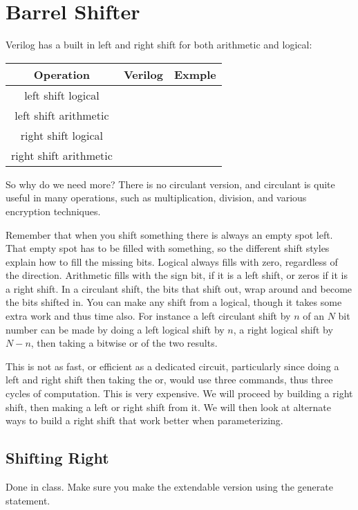 \chapter{Barrel Shifter}

Verilog has a built in left and right shift for both arithmetic and logical:

\begin{tabular}{ccr}
Operation & Verilog &  Exmple\\ \hline
left shift logical & \verb1<<1 & \verb1assign a = b <<2;1\\
left shift arithmetic & \verb1<<<1 & \verb1assign a = b <<<2;1\\\hline
right shift logical & \verb1>>1 & \verb1assign a = b >>2;1\\
right shift arithmetic & \verb1>>>1 & \verb1assign a = b >>>2;1
\end{tabular}

So why do we need more? There is no circulant version, and circulant is quite useful in many operations,
such as multiplication, division, and various encryption techniques.

Remember that when you shift something there is always an empty spot left. That empty spot has to
be filled with something, so the different shift styles explain how to fill the missing bits. Logical always fills
with zero, regardless of the direction. Arithmetic fills with the sign bit, if it is a left shift, or zeros if it is
a right shift. In a circulant shift, the bits that shift out, wrap around and become the bits shifted in. You
can make any shift from a logical, though it takes some extra work and thus time also. For instance a left
circulant shift by $n$ of an $N$ bit number can be made by doing a left logical shift by $n$, a right logical shift
by $N-n$, then taking a bitwise or of the two results.

This is not as fast, or efficient as a dedicated circuit, particularly since doing a left and right shift then
taking the or, would use three commands, thus three cycles of computation. This is very expensive.
We will proceed by building a right shift, then making a left or right shift from it. We will then look at
alternate ways to build a right shift that work better when parameterizing.



\section{Shifting Right}
Done in class.  Make sure you make the extendable version using the generate statement.

